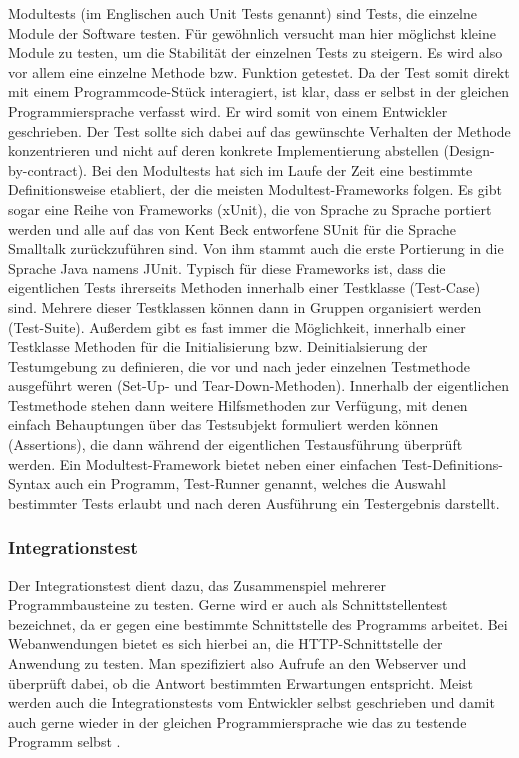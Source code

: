 Modultests (im Englischen auch Unit Tests genannt) sind Tests, die einzelne Module der Software testen. Für gewöhnlich versucht man hier möglichst kleine Module zu testen, um die Stabilität der einzelnen Tests zu steigern. Es wird also vor allem eine einzelne Methode bzw. Funktion getestet. Da der Test somit direkt mit einem Programmcode-Stück interagiert, ist klar, dass er selbst in der gleichen Programmiersprache verfasst wird. Er wird somit von einem Entwickler geschrieben. Der Test sollte sich dabei auf das gewünschte Verhalten der Methode konzentrieren und nicht auf deren konkrete Implementierung abstellen (Design-by-contract). Bei den Modultests hat sich im Laufe der Zeit eine bestimmte Definitionsweise etabliert, der die meisten Modultest-Frameworks folgen. Es gibt sogar eine Reihe von Frameworks (xUnit), die von Sprache zu Sprache portiert werden und alle auf das von Kent Beck entworfene SUnit für die Sprache Smalltalk zurückzuführen sind. Von ihm stammt auch die erste Portierung in die Sprache Java namens JUnit. Typisch für diese Frameworks ist, dass die eigentlichen Tests ihrerseits Methoden innerhalb einer Testklasse (Test-Case) sind. Mehrere dieser Testklassen können dann in Gruppen organisiert werden (Test-Suite). Außerdem gibt es fast immer die Möglichkeit, innerhalb einer Testklasse Methoden für die Initialisierung bzw. Deinitialsierung der Testumgebung zu definieren, die vor und nach jeder einzelnen Testmethode ausgeführt weren (Set-Up- und Tear-Down-Methoden). Innerhalb der eigentlichen Testmethode stehen dann weitere Hilfsmethoden zur Verfügung, mit denen einfach Behauptungen über das Testsubjekt formuliert werden können (Assertions), die dann während der eigentlichen Testausführung überprüft werden. Ein Modultest-Framework bietet neben einer einfachen Test-Definitions-Syntax auch ein Programm, Test-Runner genannt, welches die Auswahl bestimmter Tests erlaubt und nach deren Ausführung ein Testergebnis darstellt. \citep[Vgl.][S. 4 ff]{Johansen10}

\subsubsection{Integrationstest}

Der Integrationstest dient dazu, das Zusammenspiel mehrerer Programmbausteine zu testen. Gerne wird er auch als Schnittstellentest bezeichnet, da er gegen eine bestimmte Schnittstelle des Programms arbeitet. Bei Webanwendungen bietet es sich hierbei an, die HTTP-Schnittstelle der Anwendung zu testen. Man spezifiziert also Aufrufe an den Webserver und überprüft dabei, ob die Antwort bestimmten Erwartungen entspricht. Meist werden auch die Integrationstests vom Entwickler selbst geschrieben und damit auch gerne wieder in der gleichen Programmiersprache wie das zu testende Programm selbst \citep[Vgl.][]{Wiki13-03}.

